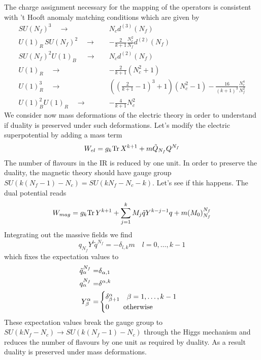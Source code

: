 The charge assignment necessary for the mapping of the operators is consistent with 't Hooft anomaly matching conditions which are given by
\begin{equation}
\begin{aligned}
SU(N_f)^3 \quad \longrightarrow \quad   & N_c d^{(3)}(N_f) \\
U(1)_R\, SU(N_f)^2 \quad \longrightarrow \quad  & -\frac{2}{k+1} \frac{N_c^2}{N_f} d^{(2)} (N_f) \\
SU(N_f)^2 U(1)_B\ \quad \longrightarrow \quad  & N_c d^{(2)}(N_f) \\
U(1)_R \quad \longrightarrow \quad  & - \frac{2}{k+1} (N_c^2 + 1) \\
U(1)_R^3 \quad \longrightarrow \quad  & \left( \left(\frac{2}{k+1} -1 \right)^3 +1 \right) (N_c^2-1) - \frac{16}{(k+1)^3} \frac{N_c^4}{N_f^2} \\
U(1)_B^2 U(1)_R \quad \longrightarrow \quad  & - \frac{4}{k+1} N_c^2
\end{aligned}
\end{equation}
We consider now mass deformations of the electric theory in order to understand if duality is preserved under such deformations.
Let's modify the electric superpotential by adding a mass term
\begin{equation}
W_{el} =  g_k \mathrm{Tr } \, X^{k+1} + m \tilde{Q}_{N_f} Q^{N_f}
\end{equation}
The number of flavours in the IR is reduced by one unit. 
In order to preserve the duality, the magnetic theory should have gauge group $SU( k (N_f - 1) - N_c) = SU(k N_f - N_c - k)$.
Let's see if this happens.
The dual potential reads
\begin{equation}
W_{mag} = g_k \mathrm{Tr } \, Y^{k+1} + \sum_{j=1}^k M_j \tilde{q} Y^{k-j-1} q + m (M_0)^{N_f}_{N_f}
\end{equation}
Integrating out the massive fields we find 
\begin{equation}
 q_{N_f} Y^{l} \tilde{q}^{N_f} = - \delta_{l,k} m \quad l=0,\dotsc, k-1
\end{equation}
which fixes the expectation values to
\begin{equation}
\begin{aligned}
\tilde{q}_{\alpha}^{N_f} = & \delta_{\alpha,1} \\
q_{\alpha}^{N_f} = & \delta^{\alpha,k}\\
Y^{\alpha}_{\beta} = & 
	\begin{cases}
		\delta_{\beta+1}^{\alpha} \quad \beta = 1 , \dotsc, k-1 \\
		0 \qquad \hbox{otherwise}
	\end{cases}
\end{aligned}
\end{equation}
These expectation values break the gauge group to $SU(k N_f - N_c) \rightarrow SU( k (N_f -1) - N_c) $ through the Higgs mechanism and reduces the number of flavours by one unit as required by duality.
As a result duality is preserved under mass deformations.
